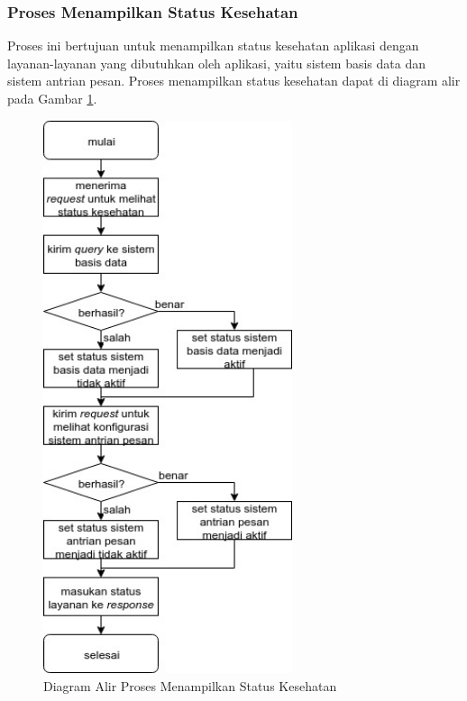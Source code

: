 \subsubsection{Proses Menampilkan Status Kesehatan}
\par Proses ini bertujuan untuk menampilkan status kesehatan aplikasi dengan layanan-layanan yang dibutuhkan oleh aplikasi, yaitu sistem basis data dan sistem antrian pesan. Proses menampilkan status kesehatan dapat di diagram alir pada Gambar \ref{fc:kesehatan}.
\begin{figure}[H]
	\centering\includegraphics[width=0.65\textwidth]{bab3/img/flowchart-menampilkan_kesehatan.jpg}
	\caption{Diagram Alir Proses Menampilkan Status Kesehatan} \label{fc:kesehatan}
\end{figure}

